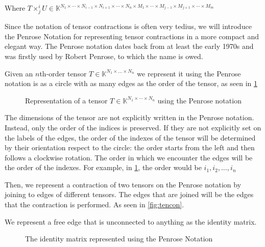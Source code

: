 \documentclass[11pt,a4paper,openright,oneside]{book}
\numberwithin{equation}{section}
\newcommand{\figref}[1]{\cref{#1}}
\begin{document}
Where $T \times^i_j U \in \mathbb{K}^{N_1 \times \cdots \times N_{i-1} \times N_{i+1} \times \cdots \times N_n \times M_1 \times \cdots \times 
M_{j-1} \times M_{j+1} \times \cdots \times M_m}$

Since the notation of tensor contractions is often very tedius, we will introduce the Penrose Notation for representing tensor contractions in a
more compact and elegant way. The Penrose notation dates back from at least the early 1970s and was
firstly used by Robert Penrose, to which the name is owed. \cite{rogerPenroseApplications}

Given an $n$th-order tensor $T \in \mathbb{K}^{N_1 \times \dots \times N_n}$ we represent it using the
Penrose notation is as a circle with as many edges as the order of the tensor, as seen in \figref{fig:tens}

\begin{figure}[h]
\centering
{}
\caption{
    Representation of a tensor $T \in \mathbb{K}^{N_1 \times \cdots \times N_n}$ using the Penrose notation
}
\label{fig:tens}
\end{figure}

The dimensions of the tensor are not explicitly written in the Penrose notation. Instead, only the order
of the indices is preserved. If they are not explicitly set on the labels of the edges,
the order of the indexes of the tensor will be determined by their orientation respect to the circle: 
the order starts from the left and then follows a clockwise rotation. The order in which we encounter the edges will be the order of the indexes. 
For example, in \figref{fig:tens}, the order would be $i_1, i_2, \dots, i_n$

Then, we represent a contraction of two tensors on the Penrose notation by joining to edges of different tensors. The edges that are
joined will be the edges that the contraction is performed. As seen in \figref{fig:tencon}.

We represent a free edge that is unconnected to anything as the identity matrix.
\begin{figure}
    \centering

    \caption{
        The identity matrix represented using the Penrose Notation
    }
\end{figure}
\end{document}
